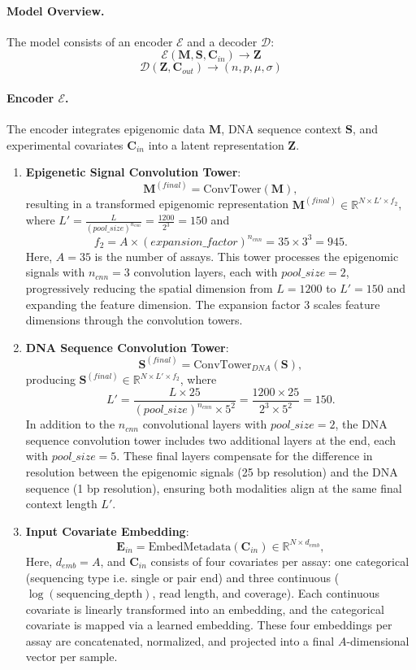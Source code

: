 \documentclass[a4paper, 11pt]{article}
\begin{document}
\paragraph{Model Overview.} The model consists of an encoder $\mathcal{E}$ and a decoder $\mathcal{D}$:
\[
 \mathcal{E}(\mathbf{M}, \mathbf{S}, \mathbf{C}_{in}) \to \mathbf{Z}
\]
\[
\mathcal{D}(\mathbf{Z}, \mathbf{C}_{out}) \to (n,p,\mu,\sigma)
\]

\paragraph{Encoder $\mathcal{E}$.}
The encoder integrates epigenomic data $\mathbf{M}$, DNA sequence context $\mathbf{S}$, and experimental covariates $\mathbf{C}_{in}$ into a latent representation $\mathbf{Z}$. 

\begin{enumerate}
    \item \textbf{Epigenetic Signal Convolution Tower}:
    \[
    \mathbf{M}^{(final)} = \text{ConvTower}(\mathbf{M}),
    \]
    resulting in a transformed epigenomic representation $\mathbf{M}^{(final)} \in \mathbb{R}^{N \times L' \times f_2}$, where $L' = \frac{L}{(pool\_size)^{n_{cnn}}} = \frac{1200}{2^3} = 150$ and 
    \[
    f_2 = A \times (expansion\_factor)^{n_{cnn}} = 35 \times 3^3 = 945.
    \]
    Here, $A=35$ is the number of assays. This tower processes the epigenomic signals with $n_{cnn} = 3$ convolution layers, each with $pool\_size=2$, progressively reducing the spatial dimension from $L=1200$ to $L'=150$ and expanding the feature dimension. The expansion factor $3$ scales feature dimensions through the convolution towers.

\item \textbf{DNA Sequence Convolution Tower}:
    \[
    \mathbf{S}^{(final)} = \text{ConvTower}_{DNA}(\mathbf{S}),
    \]
    producing $\mathbf{S}^{(final)} \in \mathbb{R}^{N \times L' \times f_2}$, where 
    \[
    L' = \frac{L \times 25}{(pool\_size)^{n_{cnn}} \times 5^2} = \frac{1200 \times 25}{2^3 \times 5^2} = 150.
    \]
    In addition to the $n_{cnn}$ convolutional layers with $pool\_size=2$, the DNA sequence convolution tower includes two additional layers at the end, each with $pool\_size=5$. These final layers compensate for the difference in resolution between the epigenomic signals (25 bp resolution) and the DNA sequence (1 bp resolution), ensuring both modalities align at the same final context length $L'$. 

    \item \textbf{Input Covariate Embedding}:
        \[
        \mathbf{E}_{in} = \text{EmbedMetadata}(\mathbf{C}_{in}) \in \mathbb{R}^{N \times d_{emb}},
        \]
        Here, $d_{emb}=A$, and $\mathbf{C}_{in}$ consists of four covariates per assay: one categorical (sequencing type i.e. single or pair end) and three continuous ($\log(\text{sequencing\_depth})$, read length, and coverage). Each continuous covariate is linearly transformed into an embedding, and the categorical covariate is mapped via a learned embedding. These four embeddings per assay are concatenated, normalized, and projected into a final $A$-dimensional vector per sample.
    

\end{enumerate}
\end{document}

